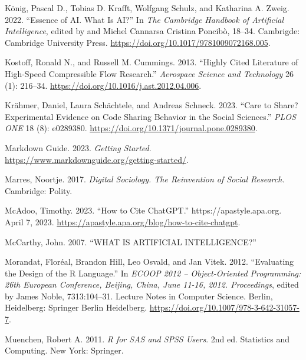 \documentclass[
  letterpaper,
]{scrbook}
\newlength{\cslhangindent}
\newlength{\cslentryspacingunit} %
\newenvironment{CSLReferences}[2] %
 {%
  \setlength{\parindent}{0pt}
  \ifodd #1
  \let\oldpar\par
  \def\par{\hangindent=\cslhangindent\oldpar}
  \fi
  \setlength{\parskip}{#2\cslentryspacingunit}
 }%
 {}
\begin{document}
\begin{CSLReferences}{1}{0}
\leavevmode{}%
König, Pascal D., Tobias D. Krafft, Wolfgang Schulz, and Katharina A.
Zweig. 2022. {``Essence of {AI}. {What Is AI}?''} In \emph{The
{Cambridge Handbook} of {Artificial Intelligence}}, edited by and Michel
Cannarsa Cristina Poncibò, 18--34. Cambrigde: Cambridge University
Press. \url{https://doi.org/10.1017/9781009072168.005}.

\leavevmode{}%
Kostoff, Ronald N., and Russell M. Cummings. 2013. {``Highly Cited
Literature of High-Speed Compressible Flow Research.''} \emph{Aerospace
Science and Technology} 26 (1): 216--34.
\url{https://doi.org/10.1016/j.ast.2012.04.006}.

\leavevmode{}%
Krähmer, Daniel, Laura Schächtele, and Andreas Schneck. 2023. {``Care to
Share? {Experimental} Evidence on Code Sharing Behavior in the Social
Sciences.''} \emph{PLOS ONE} 18 (8): e0289380.
\url{https://doi.org/10.1371/journal.pone.0289380}.

\leavevmode{}%
Markdown Guide. 2023. \emph{Getting {Started}}.
\url{https://www.markdownguide.org/getting-started/}.

\leavevmode{}%
Marres, Noortje. 2017. \emph{Digital {Sociology}. {The Reinvention} of
{Social Research}.} Cambridge: Polity.

\leavevmode{}%
McAdoo, Timothy. 2023. {``How to Cite {ChatGPT}.''}
https://apastyle.apa.org. April 7, 2023.
\url{https://apastyle.apa.org/blog/how-to-cite-chatgpt}.

\leavevmode{}%
McCarthy, John. 2007. {``{WHAT IS ARTIFICIAL INTELLIGENCE}?''}

\leavevmode{}%
Morandat, Floréal, Brandon Hill, Leo Osvald, and Jan Vitek. 2012.
{``Evaluating the {Design} of the {R Language}.''} In \emph{{ECOOP} 2012
-- {Object-Oriented Programming}: 26th {European Conference}, {Beijing},
{China}, {June} 11-16, 2012. {Proceedings}}, edited by James Noble,
7313:104--31. Lecture {Notes} in {Computer Science}. Berlin, Heidelberg:
Springer Berlin Heidelberg.
\url{https://doi.org/10.1007/978-3-642-31057-7}.

\leavevmode{}%
Muenchen, Robert A. 2011. \emph{R for {SAS} and {SPSS} Users}. 2nd ed.
Statistics and Computing. New York: Springer.


\end{CSLReferences}
\end{document}
